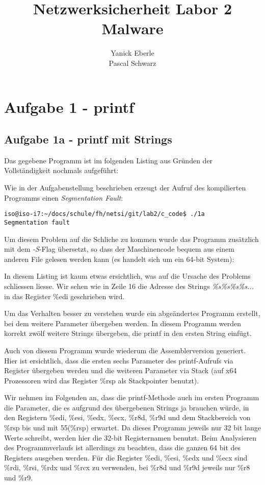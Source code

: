 \documentclass[a4paper,11pt,parskip=half]{scrartcl}
\title{Netzwerksicherheit Labor 2\\
	Malware}
\author{Yanick Eberle\\
		Pascal Schwarz}
\begin{document}
\maketitle
\date{}
\vfill
\tableofcontents
\newpage
\section{Aufgabe 1 - printf}
\subsection{Aufgabe 1a - printf mit Strings}
Das gegebene Programm ist im folgenden Listing aus Gründen der Vollständigkeit nochmals aufgeführt:

Wie in der Aufgabenstellung beschrieben erzeugt der Aufruf des kompilierten Programms einen \emph{Segmentation Fault}:
\begin{lstlisting}
iso@iso-i7:~/docs/schule/fh/netsi/git/lab2/c_code$ ./1a
Segmentation fault
\end{lstlisting}

Um diesem Problem auf die Schliche zu kommen wurde das Programm zusätzlich mit dem \emph{-S}-Flag übersetzt, so dass der Maschinencode bequem aus einem anderen File gelesen werden kann (es handelt sich um ein 64-bit System):


In diesem Listing ist kaum etwas ersichtlich, was auf die Ursache des Problems schliessen liesse. Wir sehen wie in Zeile 16 die Adresse des Strings \emph{\%s\%s\%s\%s...} in das Register \%edi geschrieben wird.

Um das Verhalten besser zu verstehen wurde ein abgeändertes Programm erstellt, bei dem weitere Parameter übergeben werden. In diesem Programm werden korrekt zwölf weitere Strings übergeben, die printf in den ersten String einfügt.


Auch von diesem Programm wurde wiederum die Assemblerversion generiert. Hier ist ersichtlich, dass die ersten sechs Parameter des printf-Aufrufs via Register übergeben werden und die weiteren Parameter via Stack (auf x64 Prozessoren wird das Register \%rsp als Stackpointer benutzt).


Wir nehmen im Folgenden an, dass die printf-Methode auch im ersten Programm die Parameter, die es aufgrund des übergebenen Strings ja brauchen würde, in den Registern \%edi, \%esi, \%edx, \%ecx, \%r8d, \%r9d und dem Stackbereich von \%rsp bis und mit 55(\%rsp) erwartet. Da dieses Programm jeweils nur 32 bit lange Werte schreibt, werden hier die 32-bit Registernamen benutzt. Beim Analysieren des Programmverlaufs ist allerdings zu beachten, dass die ganzen 64 bit des Registers ausgeben werden. Für die Register \%edi, \%esi, \%edx und \%ecx sind \%rdi, \%rsi, \%rdx und \%rcx zu verwenden, bei \%r8d und \%r9d jeweils nur \%r8 und \%r9.
\end{document}
